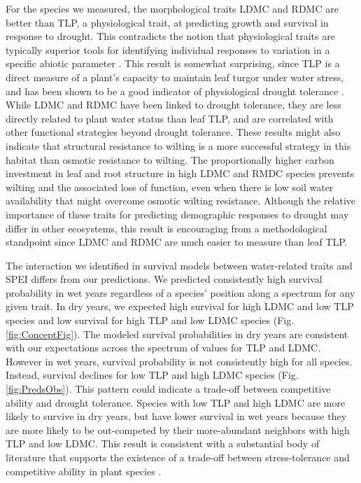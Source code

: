 \documentclass[12pt, letterpaper]{article}
\begin{document}
  For the species we measured, the morphological traits LDMC and RDMC are better than TLP, a physiological trait, at predicting growth and survival in response to drought. This contradicts the notion that physiological traits are typically superior tools for identifying individual responses to variation in a specific abiotic parameter \citep{Volaire2018}. This result is somewhat surprising, since TLP is a direct measure of a plant's capacity to maintain leaf turgor under water stress, and has been shown to be a good indicator of physiological drought tolerance \citep{Bartlett2012}. While LDMC and RDMC have been linked to drought tolerance, they are less directly related to plant water status than leaf TLP, and are correlated with other functional strategies beyond drought tolerance. These results might also indicate that structural resistance to wilting is a more successful strategy in this habitat than osmotic resistance to wilting. The proportionally higher carbon investment in leaf and root structure in high LDMC and RMDC species prevents wilting and the associated loss of function, even when there is low soil water availability that might overcome osmotic wilting resistance. Although the relative importance of these traits for predicting demographic responses to drought may differ in other ecosystems, this result is encouraging from a methodological standpoint since LDMC and RDMC are much easier to measure than leaf TLP. 

 The interaction we identified in survival models between water-related traits and SPEI differs from our predictions. We predicted consistently high survival probability in wet years regardless of a species' position along a spectrum for any given trait. In dry years, we expected high survival for high LDMC and low TLP species and low survival for high TLP and low LDMC species (Fig. \ref{fig:ConceptFig}). The modeled survival probabilities in dry years are consistent with our expectations across the spectrum of values for TLP and LDMC. However in wet years, survival probability is not consistently high for all species. Instead, survival declines for low TLP and high LDMC species (Fig. \ref{fig:PredsObs}). This pattern could indicate a trade-off between competitive ability and drought tolerance. Species with low TLP and high LDMC are more likely to survive in dry years, but have lower survival in wet years because they are more likely to be out-competed by their more-abundant neighbors with high TLP and low LDMC. This result is consistent with a substantial body of literature that supports the existence of a trade-off between stress-tolerance and competitive ability in plant species \citep{Grime1979, Grime1997, Craine2007, Volaire2018}. 
\end{document}

